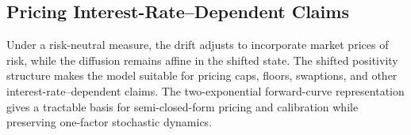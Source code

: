 \documentclass[12pt]{article}
\theoremstyle{statementstyle}
\begin{document}
\subsection{Pricing Interest-Rate--Dependent Claims}
\label{subsec:pricing}

Under a risk-neutral measure, the drift adjusts to incorporate market
prices of risk, while the diffusion remains affine in the shifted state.
The shifted positivity structure makes the model suitable for pricing
caps, floors, swaptions, and other interest-rate--dependent claims. The
two-exponential forward-curve representation gives a tractable basis for
semi-closed-form pricing and calibration while preserving one-factor
stochastic dynamics.
\end{document}
